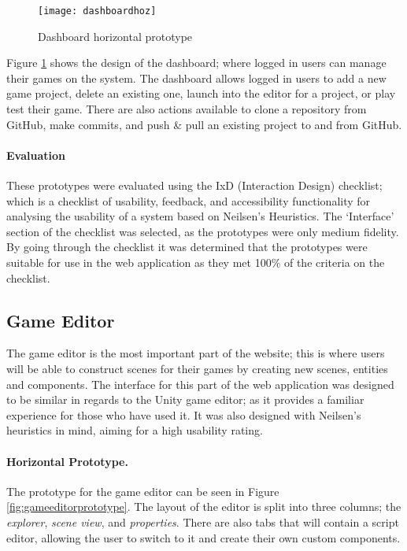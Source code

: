 	\begin{figure}[h]
		\centering
		\texttt{[image: dashboardhoz]}
		\caption{Dashboard horizontal prototype}
		\label{fig:dashboardprototype}
	\end{figure}

	Figure \ref{fig:dashboardprototype} shows the design of the dashboard; where logged in users can manage their games on the system. The dashboard allows logged in users to add a new game project, delete an existing one, launch into the editor for a project, or play test their game. There are also actions available to clone a repository from GitHub, make commits, and push \& pull an existing project to and from GitHub.

	\paragraph{Evaluation}
	These prototypes were evaluated using the IxD (Interaction Design) checklist; which is a checklist of usability, feedback, and accessibility functionality for analysing the usability of a system based on Neilsen's Heuristics.\cite{ixdchecklist} The `Interface' section of the checklist was selected, as the prototypes were only medium fidelity. By going through the checklist it was determined that the prototypes were suitable for use in the web application as they met 100\% of the criteria on the checklist.

	\subsection{Game Editor}
	The game editor is the most important part of the website; this is where users will be able to construct scenes for their games by creating new scenes, entities and components. The interface for this part of the web application was designed to be similar in regards to the Unity game editor; as it provides a familiar experience for those who have used it. It was also designed with Neilsen's heuristics in mind, aiming for a high usability rating.

	\paragraph{Horizontal Prototype.}
	The prototype for the game editor can be seen in Figure \ref{fig:gameeditorprototype}. The layout of the editor is split into three columns; the \emph{explorer}, \emph{scene view}, and \emph{properties}. There are also tabs that will contain a script editor, allowing the user to switch to it and create their own custom components.

